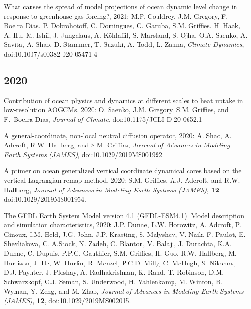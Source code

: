 \begin{etaremune}
\item What causes the spread of model projections of ocean dynamic level change in response to greenhouse gas forcing?, 2021:  M.P. Couldrey, J.M. Gregory,  F. Boeira Dias, P. Dobrohotoff, C. Domingues, O. Garuba, S.M. Griffies, H. Haak, A. Hu, M. Ishii, J. Jungclaus, A. {K\"{o}hlaffil}, S. Marsland, S. Ojha, O.A. Saenko, A. Savita, A. Shao, D. Stammer, T. Suzuki, A. Todd, L. Zanna, {\it Climate Dynamics}, doi:10.1007/s00382-020-05471-4


\subsection*{\sc \color{Maroon} 2020}

\item Contribution of ocean physics and dynamics at different scales to heat uptake in low-resolution AOGCMs, 2020: O. Saenko, J.M. Gregory, S.M. Grif\/f\/ies, and F.\ Boeira Dias, {\it Journal of Climate}, doi:10.1175/JCLI-D-20-0652.1

\item A general-coordinate, non-local neutral diffusion operator, 2020: A. Shao, A. Adcroft, R.W. Hallberg, and S.M. Grif\/f\/ies, {\it Journal of Advances in Modeling Earth Systems (JAMES)}, doi:10.1029/2019MS001992



\item A primer on ocean generalized vertical coordinate dynamical cores based on the vertical Lagrangian-remap method, 2020: S.M. Grif\/f\/ies, A.J. Adcroft, and R.W. Hallberg, {\it Journal of Advances in Modeling Earth Systems (JAMES)}, {\bf 12}, \\ doi:10.1029/2019MS001954.

\item The GFDL Earth System Model version 4.1 (GFDL-ESM4.1): Model description and simulation characteristics, 2020: J.P. Dunne, L.W. Horowitz, A. Adcroft, P. Ginoux, I.M. Held, J.G. John, J.P. Krasting, S. Malyshev, V. Naik, F. Paulot, E. Shevliakova, C. A.Stock, N. Zadeh, C. Blanton, V. Balaji, J. Durachta, K.A. Dunne, C. Dupuis, P.P.G. Gauthier, S.M. Griffies, H. Guo, R.W. Hallberg, M. Harrison, J. He, W. Hurlin, R. Menzel, P.C.D. Milly, C. McHugh, S. Nikonov, D.J. Paynter, J. Ploshay, A. Radhakrishnan, K. Rand, T. Robinson, D.M. Schwarzkopf, C.J. Seman, S. Underwood, H. Vahlenkamp, M. Winton, B. Wyman, Y. Zeng, and M. Zhao, {\it Journal of Advances in Modeling Earth Systems (JAMES)}, {\bf 12}, doi:10.1029/2019MS002015.


\end{etaremune}
